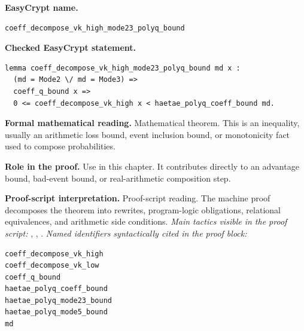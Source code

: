 \begin{formaltheorem}
\noindent\textbf{EasyCrypt name.}
\begin{lstlisting}[language=EasyCrypt,basicstyle=\ttfamily\scriptsize]
coeff_decompose_vk_high_mode23_polyq_bound
\end{lstlisting}
\noindent\textbf{Checked EasyCrypt statement.}
\begin{lstlisting}[language=EasyCrypt,basicstyle=\ttfamily\scriptsize]
lemma coeff_decompose_vk_high_mode23_polyq_bound md x :
  (md = Mode2 \/ md = Mode3) =>
  coeff_q_bound x =>
  0 <= coeff_decompose_vk_high x < haetae_polyq_coeff_bound md.
\end{lstlisting}
\noindent\textbf{Formal mathematical reading.}
Mathematical theorem. This is an inequality, usually an arithmetic loss bound, event inclusion bound, or monotonicity fact used to compose probabilities.

\noindent\textbf{Role in the proof.}
Use in this chapter. It contributes directly to an advantage bound, bad-event bound, or real-arithmetic composition step.

\noindent\textbf{Proof-script interpretation.}
Proof-script reading. The machine proof decomposes the theorem into rewrites, program-logic obligations, relational equivalences, and arithmetic side conditions.
\emph{Main tactics visible in the proof script:} , , .
\emph{Named identifiers syntactically cited in the proof block:}
\begin{lstlisting}[language=EasyCrypt,basicstyle=\ttfamily\scriptsize]
coeff_decompose_vk_high
coeff_decompose_vk_low
coeff_q_bound
haetae_polyq_coeff_bound
haetae_polyq_mode23_bound
haetae_polyq_mode5_bound
md
\end{lstlisting}

\end{formaltheorem}

